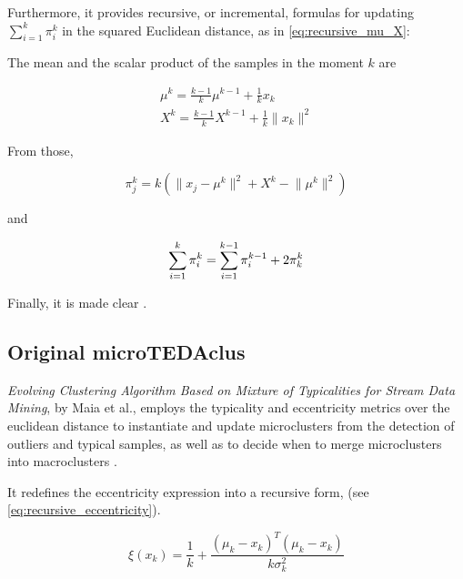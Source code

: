 \documentclass[a4paper]{article}
\begin{document}
Furthermore, it provides recursive, or incremental, formulas for updating $\sum_{i=1}^{k} \pi^k_i$ in the squared Euclidean distance, as in \cref{eq:recursive_mu_X}:

The mean and the scalar product of the samples in the moment $k$ are

\begin{equation}
\begin{gathered}
    \mu^k = \frac{k - 1}{k} \mu^{k-1} + \frac{1}{k} x_k \\
    X^k = \frac{k - 1}{k} X^{k-1} + \frac{1}{k} \lVert x_k \rVert^2
\end{gathered} \label{eq:recursive_mu_X}
\end{equation}

From those,

\begin{equation}
    \pi^k_j = k (\lVert x_j - \mu^k \rVert^2 + X^k - \lVert \mu^k \rVert^2)
\end{equation}

and

\begin{equation}
    \sum_{i=1}^{k} \pi^k_i = \sum_{i=1}^{k-1} \pi^{k-1}_i + 2 \pi^k_k \\
\end{equation}

Finally, it is made clear  \cite{mahalanobis2018generalized}.

\subsection{Original microTEDAclus}

\textit{Evolving Clustering Algorithm Based on Mixture of Typicalities for Stream Data Mining}, by Maia et al., employs the typicality and eccentricity metrics over the euclidean distance to instantiate and update microclusters from the detection of outliers and typical samples, as well as to decide when to merge microclusters into macroclusters \cite{maia2020evolvclus}.

It redefines the eccentricity expression into a recursive form, (see \cref{eq:recursive_eccentricity}).

\begin{equation}
    \xi(x_k) = \frac{1}{k} + \frac{\left( \mu_k - x_k \right)^T \left( \mu_k - x_k \right)}{k \sigma^2_k} \label{eq:recursive_eccentricity}
\end{equation}
\end{document}
